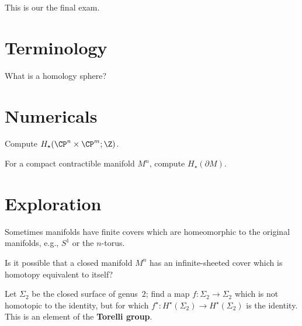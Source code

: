 \documentclass{homework}
\author{Jim Fowler}
\begin{document}
\maketitle

\begin{inspiration}
  This is our the final exam.
\end{inspiration}

\section{Terminology}

\begin{problem}
 What is a homology sphere? 
\end{problem}

\section{Numericals}

\begin{problem}
  Compute $H_\star(\CP^n \times \CP^m; \Z)$.
\end{problem}

\begin{problem}
  For a compact contractible manifold $M^n$, compute $H_\star(\partial M)$.
\end{problem}

\section{Exploration}



\begin{problem}
  Sometimes manifolds have finite covers which are homeomorphic to the
  original manifolds, e.g., $S^1$ or the $n$-torus.

  Is it possible that a closed manifold $M^n$ has an infinite-sheeted
  cover which is homotopy equivalent to itself?
\end{problem}

\begin{problem}
  Let $\Sigma_2$ be the closed surface of genus~$2$; find a map $f :
  \Sigma_2 \to \Sigma_2$ which is not homotopic to the identity, but
  for which $f^\star : H^\star(\Sigma_2) \to H^\star(\Sigma_2)$ is the
  identity.  This is an element of the \textbf{Torelli group}.
\end{problem}
\end{document}
